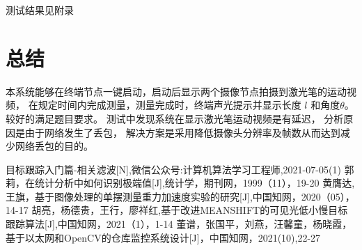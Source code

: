 \documentclass[scheme=chinese,a4paper]{article}
\begin{document}
测试结果见附录

\section{总结}
本系统能够在终端节点一键启动，启动后显示两个摄像节点拍摄到激光笔的运动视频，
在规定时间内完成测量，测量完成时，终端声光提示并显示长度 $l$ 和角度$\theta$。较好的满足题目要求。
测试中发现系统在显示激光笔运动视频是有延迟，
分析原因是由于网络发生了丢包，
解决方案是采用降低摄像头分辨率及帧数从而达到减少网络丢包的目的。
\begin{thebibliography}{5}  
目标跟踪入门篇-相关滤波[N],微信公众号:计算机算法学习工程师,2021-07-05(1) 
郭莉，在统计分析中如何识别极端值[J],统计学，期刊网，1999（11），19-20
黄膺达,王旗，基于图像处理的单摆测量重力加速度实验的研究[J],中国知网，2020（05），14-17
胡亮，杨德贵，王行，廖祥红,基于改进MEANSHIFT的可见光低小慢目标跟踪算法[J],中国知网，2021（1），1-14
董谱，张国平，刘燕，汪馨童，杨晓霞，基于以太网和OpenCV的仓库监控系统设计[J]，中国知网，2021(10),22-27

\end{thebibliography}
\end{document}
